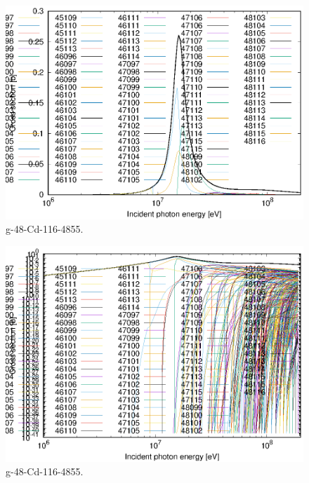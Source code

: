 \begin{figure}
 \includegraphics[width=\linewidth]{eps/g_48-Cd-116_4855.eps}
  \caption{g-48-Cd-116-4855.}
\end{figure}
\begin{figure}
 \includegraphics[width=\linewidth]{eps-log/g_48-Cd-116_4855.eps}
 \caption{g-48-Cd-116-4855.}
\end{figure}
\newpage \clearpage

